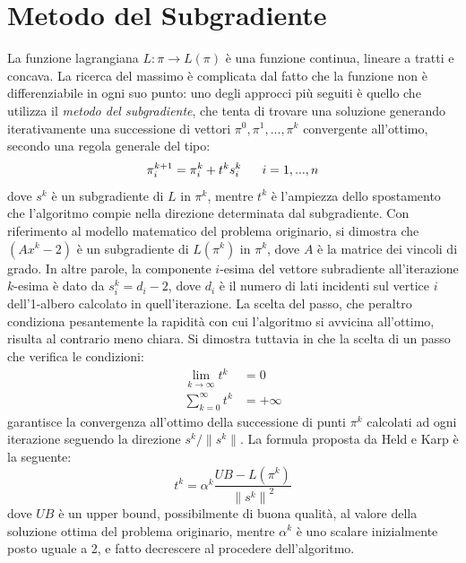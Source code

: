 \section{Metodo del Subgradiente} 
La funzione lagrangiana $L:\pi \longrightarrow L(\pi)$ è una funzione continua, lineare a tratti e concava. La ricerca del massimo è complicata dal fatto che la funzione non è differenziabile in ogni suo punto: uno degli approcci più seguiti è quello che utilizza il \emph{metodo del subgradiente}, che tenta di trovare una soluzione generando iterativamente una successione di vettori $\pi^0, \pi^1, ..., \pi^k$ convergente all'ottimo, secondo una regola generale del tipo:
\begin{equation}
\pi^{k+1}_i = \pi^k_i + t^k s^k_i \text{\: \: \: } i = 1, ..., n \label{eqn:hkupdate}
\end{equation}
dove $s^k$ è un subgradiente di $L$ in $\pi^k$, mentre $t^k$ è l'ampiezza dello spostamento che l'algoritmo compie nella direzione determinata dal subgradiente. Con riferimento al modello matematico del problema originario, si dimostra che $(Ax^k - 2)$ è un subgradiente di $L(\pi^k)$ in $\pi^k$, dove $A$ è la matrice dei vincoli di grado. In altre parole, la componente $i$-esima del vettore subradiente all'iterazione $k$-esima è dato da $s^k_i = d_i - 2$, dove $d_i$ è il numero di lati incidenti sul vertice $i$ dell'1-albero calcolato in quell'iterazione. 
La scelta del passo, che peraltro condiziona pesantemente la rapidità con cui l'algoritmo si avvicina all'ottimo, risulta al contrario meno chiara. Si dimostra tuttavia in \citet*{held1970traveling} che la scelta di un passo che verifica le condizioni:
\begin{align}
\lim_{k \to \infty} t^k &= 0 \label{eqn:hksuffcond1} \\
\sum^{\infty}_{k = 0} t^k &= +\infty \label{eqn:hksuffcond2}
\end{align}
garantisce la convergenza all'ottimo della successione di punti $\pi^k$ calcolati ad ogni iterazione seguendo la direzione $s^k / \parallel s^k \parallel$. La formula proposta da Held e Karp è la seguente:
\begin{equation}
t^k = \alpha^k \frac{UB - L(\pi^k)}{{\parallel s^k \parallel}^2} \label{eqn:hkstep}
\end{equation}
dove $UB$ è un upper bound, possibilmente di buona qualità, al valore della soluzione ottima del problema originario, mentre $\alpha^k$ è uno scalare inizialmente posto uguale a 2, e fatto decrescere al procedere dell'algoritmo.

